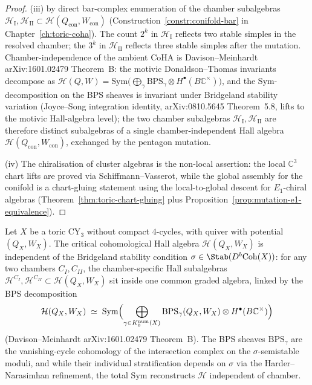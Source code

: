 \begin{proof}
(iii) by direct bar-complex enumeration of the chamber subalgebras
$\mathcal{H}_{\mathrm{I}}, \mathcal{H}_{\mathrm{II}} \subset
\mathcal{H}(Q_{\mathrm{con}}, W_{\mathrm{con}})$
(Construction~\ref{constr:conifold-bar} in
Chapter~\ref{ch:toric-coha}). The
count $2^k$ in $\mathcal{H}_{\mathrm{I}}$ reflects two stable simples
in the resolved chamber; the $3^k$ in $\mathcal{H}_{\mathrm{II}}$
reflects three stable simples after the mutation. Chamber-independence
of the ambient CoHA is Davison--Meinhardt \textup{arXiv:1601.02479}
Theorem~B: the motivic Donaldson--Thomas invariants decompose as
$\mathcal{H}(Q, W) = \mathrm{Sym}\bigl(\bigoplus_\gamma
\mathrm{BPS}_\gamma \otimes H^\bullet(B\mathbb{C}^\times)\bigr)$,
and the $\mathrm{Sym}$-decomposition on the BPS sheaves is invariant
under Bridgeland stability variation (Joyce--Song integration
identity, \textup{arXiv:0810.5645} Theorem~5.8, lifts to the motivic
Hall-algebra level); the two chamber subalgebras
$\mathcal{H}_{\mathrm{I}}, \mathcal{H}_{\mathrm{II}}$ are therefore
distinct subalgebras of a single chamber-independent Hall algebra
$\mathcal{H}(Q_{\mathrm{con}}, W_{\mathrm{con}})$, exchanged by the
pentagon mutation.

(iv) The chiralisation of cluster algebras is the non-local assertion:
the local $\mathbb{C}^3$ chart lifts are proved via
Schiffmann--Vasserot, while the global assembly for the conifold is a
chart-gluing statement using the local-to-global descent for
$E_1$-chiral algebras
(Theorem~\textup{\ref{thm:toric-chart-gluing}} plus
Proposition~\textup{\ref{prop:mutation-e1-equivalence}}).
\end{proof}

\begin{proposition}
\label{prop:coha-chamber-independent-dm}
Let $X$ be a toric CY$_3$ without compact $4$-cycles, with quiver with
potential $(Q_X, W_X)$. The critical cohomological Hall algebra
$\mathcal{H}(Q_X, W_X)$ is independent of the Bridgeland stability
condition $\sigma \in \Stab(D^b\mathrm{Coh}(X))$: for any two chambers
$C_I, C_{II}$, the chamber-specific Hall subalgebras
$\mathcal{H}^{C_I}, \mathcal{H}^{C_{II}} \subset \mathcal{H}(Q_X, W_X)$
sit inside one common graded algebra, linked by the BPS decomposition
\[
 \mathcal{H}(Q_X, W_X)
 \;\simeq\;
 \mathrm{Sym}\Bigl(
 \bigoplus_{\gamma \in K_0^{\mathrm{num}}(X)}
 \mathrm{BPS}_\gamma(Q_X, W_X) \otimes H^\bullet(B\mathbb{C}^\times)
 \Bigr)
\]
(Davison--Meinhardt \textup{arXiv:1601.02479} Theorem~B). The BPS
sheaves $\mathrm{BPS}_\gamma$ are the vanishing-cycle cohomology of
the intersection complex on the $\sigma$-semistable moduli, and while
their individual stratification depends on $\sigma$ via the
Harder--Narasimhan refinement, the total $\mathrm{Sym}$ reconstructs
$\mathcal{H}$ independent of chamber.
\end{proposition}

